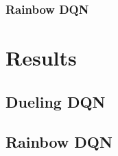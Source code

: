 \documentclass[12pt,a4paper]{article}
\begin{document}
    \subsubsection{Rainbow DQN}

    \section{Results}\label{sec:results}
    \subsection{Dueling DQN}\label{subsec:dueling-dqn2}

    \subsection{Rainbow DQN}\label{subsec:rainbow-dqn2}
\end{document}
